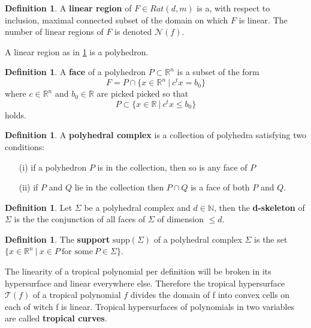 \documentclass{article}
\theoremstyle{definition}
\newtheorem{definition}[theorem]{Definition}
\begin{document}
\begin{definition}\hspace{1sp}\cite[p.~4]{zhang2018tropical}
\label{def:lin_reg_of}
A \textbf{linear region} of $F \in Rat(d, m)$ is a, with respect to inclusion, maximal connected subset of the domain on which $F$ is linear. The number of linear regions of $F$ is denoted $\mathcal{N}(f)$.
\end{definition}
A linear region as in \ref{def:lin_reg_of} is a polyhedron.
\begin{definition}
A \textbf{face} of a polyhedron $P \subset \mathbb{R}^{n}$ is a subset of the form
$$F= P \cap \{x \in \mathbb{R}^{n} \ | \ c^{t}x = b_0 \}$$
where $c \in \mathbb{R}^{n}$ and $b_0 \in \mathbb{R}$ are picked picked so that
$$P \subset \{ x \in \mathbb{R} \ | \ c^{t}x \leq b_0 \}$$
holds.
\end{definition}

\begin{definition}\hspace{1sp}\cite{maclagan2015introduction}
A \textbf{polyhedral complex} is a collection of polyhedra satisfying two conditions:
\begin{itemize}
\item[(i)]
if a polyhedron $P$ is in the collection, then so is any face of $P$
\item[(ii)]
if $P$ and $Q$ lie in the collection then $P \cap Q$ is a face of both $P$ and $Q$.
\end{itemize}
\end{definition}
\begin{definition}
Let $\Sigma$ be a polyhedral complex and $d \in \mathbb{N}$, then the \textbf{d-skeleton} of $\Sigma$ is the the conjunction of all faces of $\Sigma$ of dimension $\leq d$.
\end{definition}
\begin{definition}\hspace{1sp}\cite{maclagan2015introduction}
The \textbf{support} $\text{supp}(\Sigma)$ of a polyhedral complex $\Sigma$ is the set $\{ x \in \mathbb{R}^{n} \ | \ x \in P \ \text{for some} \ P \in \Sigma \}.$
\end{definition}


The linearity of a tropical polynomial per definition will be broken in its hypersurface and linear everywhere else. Therefore the tropical hypersurface $\mathcal{T}(f)$ of a tropical polynomial $f$ divides the domain of f into convex cells on each of witch f is linear. Tropical hypersurfaces of polynomials in two variables are called \textbf{tropical curves}.\cite[p.~3]{zhang2018tropical}
\end{document}
